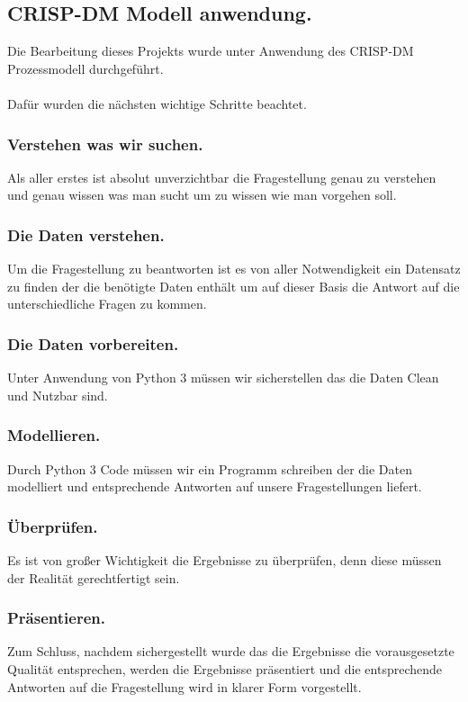 \documentclass[a4paper,12pt]{article}
\begin{document}
\subsection{CRISP-DM Modell anwendung.}
Die Bearbeitung dieses Projekts wurde unter Anwendung des CRISP-DM Prozessmodell durchgeführt.\\
\\
Dafür wurden die nächsten wichtige Schritte beachtet.

\subsubsection{Verstehen was wir suchen.}
Als aller erstes ist absolut unverzichtbar die Fragestellung genau zu verstehen und genau wissen was man sucht um zu wissen wie man vorgehen soll.

\subsubsection{Die Daten verstehen.}
Um die Fragestellung zu beantworten ist es von aller Notwendigkeit ein Datensatz zu finden der die benötigte Daten enthält um auf dieser Basis die Antwort auf die unterschiedliche Fragen zu kommen.

\subsubsection{Die Daten vorbereiten.}
Unter Anwendung von Python 3 müssen wir sicherstellen das die Daten Clean und Nutzbar sind.

\subsubsection{Modellieren.}
Durch Python 3 Code müssen wir ein Programm schreiben der die Daten modelliert und entsprechende Antworten auf unsere Fragestellungen liefert. 

\subsubsection{Überprüfen.}
Es ist von großer Wichtigkeit die Ergebnisse zu überprüfen, denn diese müssen der Realität gerechtfertigt sein.

\subsubsection{Präsentieren.}
Zum Schluss, nachdem sichergestellt wurde das die Ergebnisse die vorausgesetzte Qualität entsprechen, werden die Ergebnisse präsentiert und die entsprechende Antworten auf die Fragestellung wird in klarer Form vorgestellt.
\end{document}
